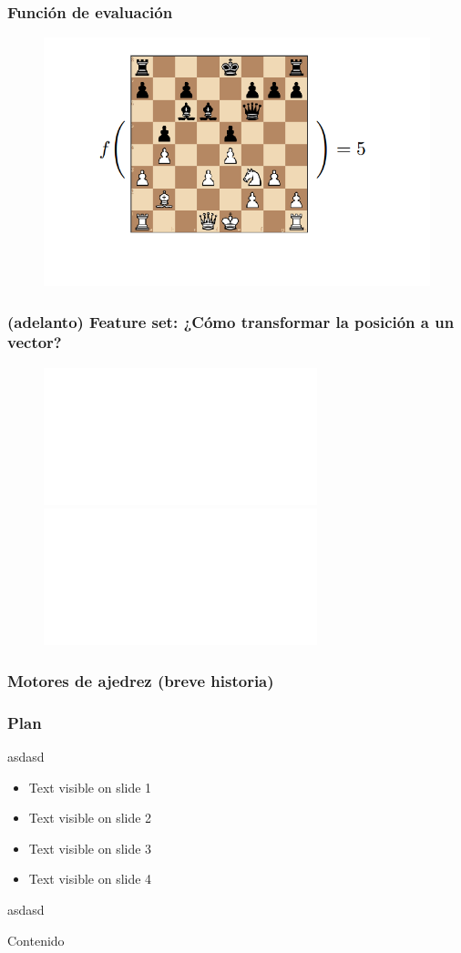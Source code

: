 \begin{frame}
\frametitle{Función de evaluación}
\begin{figure}
    \centering
    \includegraphics[width=0.8\linewidth]{../assets/slides/eval.png}
\end{figure}
\end{frame}

\begin{frame}
\frametitle{(adelanto) Feature set: ¿Cómo transformar la posición a un vector?}
\begin{figure}
\centering
\includegraphics<1>[width=1.0\linewidth]{../assets/slides/fs_motiv.pdf}
\includegraphics<2>[width=1.0\linewidth]{../assets/slides/fs_motiv2.pdf}
\end{figure}
\end{frame}

\begin{frame}
\frametitle{Motores de ajedrez (breve historia)}


\end{frame}






\begin{frame}
\frametitle{Plan}

asdasd

\begin{itemize}
\item<1-> Text visible on slide 1
\item<2-> Text visible on slide 2
\item<3> Text visible on slide 3
\item<4-> Text visible on slide 4
\end{itemize}

asdasd

\end{frame}


\begin{frame}{Contenido}
\tableofcontents
\end{frame}
